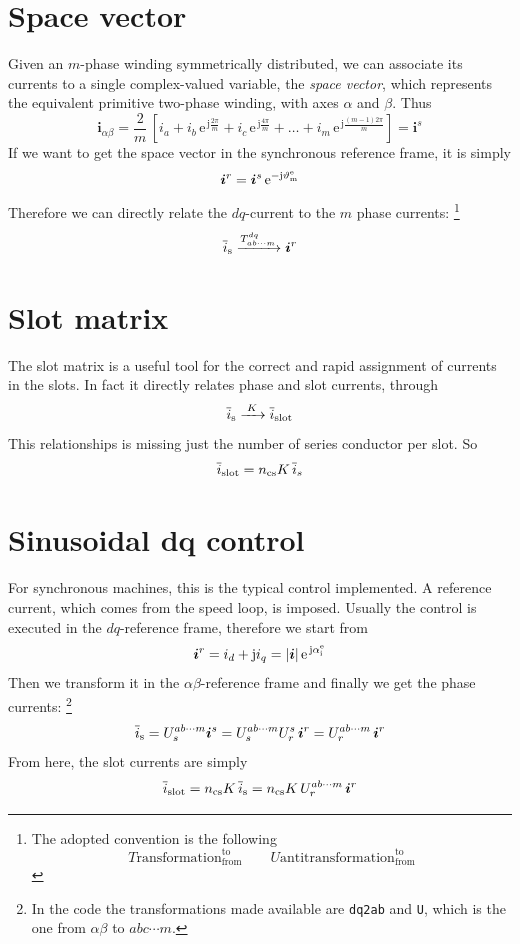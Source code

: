 \documentclass[a4paper,11pt,oneside,fleqn,titlepage]{report}
\newcommand{\ncs}{n_{\textup{cs}}}
\newcommand{\islot}[1][]{\vec{i}_{\textup{slot}#1}}
\newcommand{\eu}{\textrm{e}}
\newcommand{\je}{\textrm{j}}
\newcommand{\thh}{\vartheta}
\newcommand{\thm}{\thh_{\textup{m}}}
\newcommand{\thme}{\thm^{\textup{e}}}
\newcommand{\alphaie}{\alpha_{\textup{i}}^{\textup{e}}}
\newcommand{\sv}[1]{\bm{#1}}
\renewcommand{\vec}[1]{\overline{#1}}
\begin{document}
\section{Space vector}
Given an $ m $-phase winding symmetrically distributed, we can associate its 
currents to a single complex-valued variable, the \emph{space vector}, which 
represents the equivalent primitive two-phase winding, with axes $ \alpha $ and 
$ \beta $. Thus
\[
\sv{i}_{\alpha\beta} = \frac{2}{m}\,\left[ 
i_a + i_b\,\eu^{\,\je\frac{2\pi}{m}} + i_c\,\eu^{\,\je\frac{4\pi}{m}} + \ldots
+ i_m\,\eu^{\,\je\frac{(m-1)2\pi}{m}}
\right] = \sv{i}^s
\]
If we want to get the space vector in the synchronous reference frame, it is 
simply
\[
\sv{i}^r = \sv{i}^s\,\eu^{-\je\thme}
\]
Therefore we can directly relate the $ dq $-current to the 
$ m $ phase currents:%
\footnote{The adopted convention is the following
\[
T\text{ransformation}_{\text{from}}^{\text{to}} \qquad
U\text{antitransformation}_{\text{from}}^{\text{to}}
\]%
}
\begin{align*}
\vec{i}_{\textup{s}} \xrightarrow{T_{ab\cdots m}^{dq}} 
\sv{i}^r
\end{align*}


\section{Slot matrix}
The slot matrix is a useful tool for the correct and rapid 
assignment of currents in the slots. In fact it directly 
relates phase and slot currents, through
\[
\vec{i}_{\textup{s}} \xrightarrow{\;K\;} 
\vec{i}_{\textup{slot}}
\]
This relationships is missing just the number of series 
conductor per slot. So
\[
\vec{i}_{\textup{slot}} = \ncs K \, \vec{i}_s
\]


\section{Sinusoidal dq control}
For synchronous machines, this is the typical control 
implemented. A reference current, which comes from the 
speed loop, is imposed. Usually the control is executed in 
the $ dq $-reference frame, therefore we start from
\[
\sv{i}^r = i_d + \je i_q = |\sv{i}|\,\eu^{\,\je\alphaie}
\]
Then we transform it in the $ \alpha\beta $-reference frame 
and finally we get the phase currents:%
\footnote{%
In the code the transformations made available are
\texttt{dq2ab} and \texttt{U}, which is the one from $ 
\alpha\beta $ to $ abc\cdots m $.
}
\[
\vec{i}_{\textup{s}} = U_{s}^{ab\cdots m}\sv{i}^s = 
U_{s}^{ab\cdots m} 
U_{r}^{s}\,\sv{i}^r = U_{r}^{ab\cdots m}\,\sv{i}^r
\]
%
From here, the slot currents are simply
\[
\islot = \ncs K\,\vec{i}_{\textup{s}} = \ncs 
K\,U_{r}^{ab\cdots 
m}\,\sv{i}^r
\]
\end{document}
